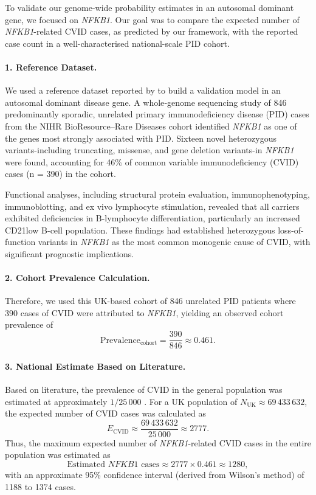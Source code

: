 To validate our genome-wide probability estimates in an autosomal dominant gene, we focused on \textit{NFKB1}. Our goal was to compare the expected number of \textit{NFKB1}-related CVID cases, as predicted by our framework, with the reported case count in a well-characterised national-scale PID cohort.

\paragraph{1. Reference Dataset.}
We used a reference dataset reported by \citet{tuijnenburgNFKB12018} to build a validation model in an autosomal dominant disease gene. 
A whole‐genome sequencing study of 846 predominantly sporadic, unrelated primary immunodeficiency disease (PID) cases from the NIHR BioResource–Rare Diseases cohort  identified \textit{NFKB1} as one of the genes most strongly associated with PID. Sixteen novel heterozygous variants-including truncating, missense, and gene deletion variants-in \textit{NFKB1} were found, accounting for 46\% of common variable immunodeficiency (CVID) cases (n = 390) in the cohort. 

Functional analyses, including structural protein evaluation, immunophenotyping, immunoblotting, and ex vivo lymphocyte stimulation, revealed that all carriers exhibited deficiencies in B-lymphocyte differentiation, particularly an increased CD21low B-cell population. These findings had established heterozygous loss-of-function variants in \textit{NFKB1} as the most common monogenic cause of CVID, with significant prognostic implications.

\paragraph{2. Cohort Prevalence Calculation.}
Therefore, we used this UK-based cohort of 846 unrelated PID patients where 390 cases of CVID were attributed to \textit{NFKB1}, yielding an observed cohort prevalence of
\[
\text{Prevalence}_{\text{cohort}} = \frac{390}{846} \approx 0.461.
\]

\paragraph{3. National Estimate Based on Literature.}
Based on literature, the prevalence of CVID in the general population was estimated at approximately \(1/25\,000\)
\cite{tuijnenburgNFKB12018,
who1997primary,
cunningham1999common,
oksenhendler2008infections}.
For a UK population of \(N_{\text{UK}} \approx 69\,433\,632\), the expected number of CVID cases was calculated as
\[
E_{\text{CVID}} \approx \frac{69\,433\,632}{25\,000} \approx 2777.
\]
Thus, the maximum expected number of \textit{NFKB1}-related CVID cases in the entire population was estimated as
\[
\text{Estimated } NFKB1 \text{ cases} \approx 2777 \times 0.461 \approx 1280,
\]
with an approximate 95\% confidence interval (derived from Wilson’s method) of 1188 to 1374 cases.

